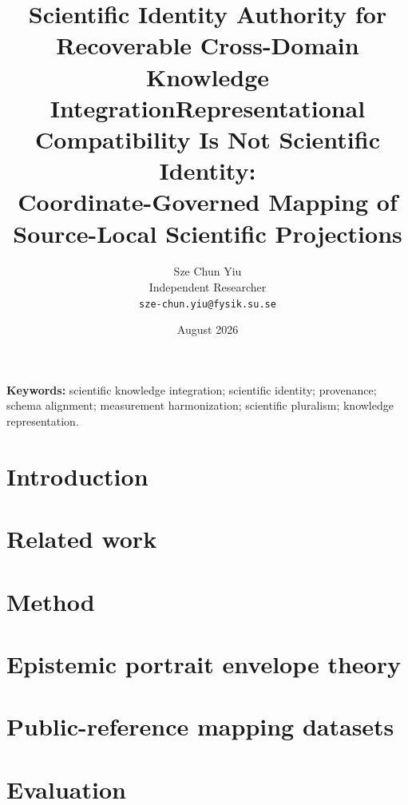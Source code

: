 \documentclass[11pt]{article}
\title{Scientific Identity Authority for Recoverable Cross-Domain Knowledge Integration}
\title{Representational Compatibility Is Not Scientific Identity:\\
Coordinate-Governed Mapping of Source-Local Scientific Projections}
\author{Sze Chun Yiu\\Independent Researcher\\\texttt{sze-chun.yiu@fysik.su.se}}
\date{August 2026}
\theoremstyle{definition}
\begin{document}
\maketitle

\begin{abstract}

\end{abstract}

\noindent\textbf{Keywords:} scientific knowledge integration; scientific identity; provenance; schema alignment; measurement harmonization; scientific pluralism; knowledge representation.

\section{Introduction}
\label{sec:introduction}


\section{Related work}
\label{sec:related}


\section{Method}
\label{sec:method}



\section{Epistemic portrait envelope theory}
\label{sec:envelope}


\section{Public-reference mapping datasets}
\label{sec:dataset}


\section{Evaluation}
\label{sec:eval}













\end{document}
